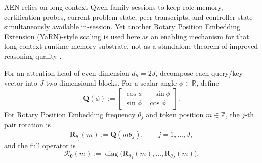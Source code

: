 \documentclass[11pt]{article}
\begin{document}
AEN relies on long-context Qwen-family sessions to keep role memory, certification probes, current problem state, peer transcripts, and controller state simultaneously available in-session. Yet another Rotary Position Embedding Extension (YaRN)-style scaling is used here as an enabling mechanism for that long-context runtime-memory substrate, not as a standalone theorem of improved reasoning quality \citep{peng2023yarn,yang2025qwen25oneM}.

For an attention head of even dimension \(d_h=2J\), decompose each query/key vector into \(J\) two-dimensional blocks. For a scalar angle \(\phi\in\mathbb R\), define
\begin{equation}
\mathbf Q(\phi)
:=
\begin{bmatrix}
\cos \phi & -\sin \phi\\
\sin \phi & \cos \phi
\end{bmatrix}.
\label{eq:yarn-Q}
\end{equation}
For Rotary Position Embedding frequency \(\theta_j\) and token position \(m\in\mathbb Z\), the \(j\)-th pair rotation is
\begin{equation}
\mathbf R_{\theta_j}(m):=\mathbf Q(m\theta_j),
\qquad j=1,\dots,J,
\label{eq:yarn-pair-rotation}
\end{equation}
and the full operator is
\begin{equation}
\mathcal R_{\boldsymbol\theta}(m)
:=
\operatorname{diag}\!\bigl(
\mathbf R_{\theta_1}(m),\dots,\mathbf R_{\theta_J}(m)
\bigr).
\label{eq:yarn-full-rope}
\end{equation}
\end{document}
